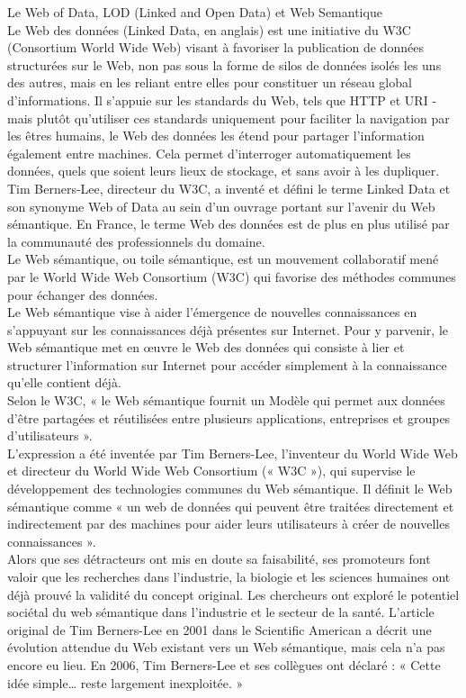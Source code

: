  Le Web of Data, LOD (Linked and Open Data) et Web Semantique \\
Le Web des données (Linked Data, en anglais) est une initiative du W3C (Consortium World Wide Web) visant à favoriser la publication de données structurées sur le Web, non pas sous la forme de silos de données isolés les uns des autres, mais en les reliant entre elles pour constituer un réseau global d'informations. Il s'appuie sur les standards du Web, tels que HTTP et URI - mais plutôt qu'utiliser ces standards uniquement pour faciliter la navigation par les êtres humains, le Web des données les étend pour partager l'information également entre machines. Cela permet d'interroger automatiquement les données, quels que soient leurs lieux de stockage, et sans avoir à les dupliquer. \\
Tim Berners-Lee, directeur du W3C, a inventé et défini le terme Linked Data et son synonyme Web of Data au sein d'un ouvrage portant sur l'avenir du Web sémantique. En France, le terme Web des données est de plus en plus utilisé par la communauté des professionnels du domaine. \\
Le Web sémantique, ou toile sémantique, est un mouvement collaboratif mené par le World Wide Web Consortium (W3C) qui favorise des méthodes communes pour échanger des données.\\
Le Web sémantique vise à aider l'émergence de nouvelles connaissances en s'appuyant sur les connaissances déjà présentes sur Internet. Pour y parvenir, le Web sémantique met en œuvre le Web des données qui consiste à lier et structurer l'information sur Internet pour accéder simplement à la connaissance qu'elle contient déjà. \\
Selon le W3C, « le Web sémantique fournit un Modèle qui permet aux données d'être partagées et réutilisées entre plusieurs applications, entreprises et groupes d'utilisateurs ».\\
L'expression a été inventée par Tim Berners-Lee, l'inventeur du World Wide Web et directeur du World Wide Web Consortium (« W3C »), qui supervise le développement des technologies communes du Web sémantique. Il définit le Web sémantique comme « un web de données qui peuvent être traitées directement et indirectement par des machines pour aider leurs utilisateurs à créer de nouvelles connaissances ».\\
Alors que ses détracteurs ont mis en doute sa faisabilité, ses promoteurs font valoir que les recherches dans l'industrie, la biologie et les sciences humaines ont déjà prouvé la validité du concept original. Les chercheurs ont exploré le potentiel sociétal du web sémantique dans l'industrie et le secteur de la santé. L'article original de Tim Berners-Lee en 2001 dans le Scientific American a décrit une évolution attendue du Web existant vers un Web sémantique, mais cela n'a pas encore eu lieu. En 2006, Tim Berners-Lee et ses collègues ont déclaré : « Cette idée simple… reste largement inexploitée. »\\

